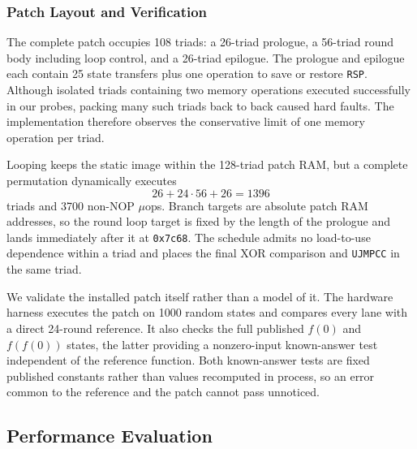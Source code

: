 \documentclass[journal=tches,submission]{iacrtrans}
\makeatletter
\newcommand{\code}[1]{\texttt{#1}}
\newcommand{\uaddr}[1]{\texttt{0x#1}}
\renewcommand\paragraph{\@startsection{paragraph}{4}{\z@}%
      {1.75ex \@plus .3ex \@minus .2ex}%
      {-1em}%
      {\normalfont\normalsize\bfseries\SS@parafont}}
\makeatother
\begin{document}
\subsubsection{Patch Layout and Verification}

The complete patch occupies 108 triads: a 26-triad prologue, a 56-triad round body including loop control, and a 26-triad epilogue.
The prologue and epilogue each contain 25 state transfers plus one operation to save or restore \code{RSP}.
Although isolated triads containing two memory operations executed successfully in our probes, packing many such triads back to back caused hard faults.
The implementation therefore observes the conservative limit of one memory operation per triad.

Looping keeps the static image within the 128-triad patch RAM, but a complete permutation dynamically executes
\[
26 + 24\cdot56 + 26 = 1396
\]
triads and 3700 non-NOP $\mu$ops.
Branch targets are absolute patch RAM addresses, so the round loop target is fixed by the length of the prologue and lands immediately after it at \uaddr{7c68}.
The schedule admits no load-to-use dependence within a triad and places the final XOR comparison and \code{UJMPCC} in the same triad.

We validate the installed patch itself rather than a model of it.
The hardware harness executes the patch on 1000 random states and compares every lane with a direct 24-round reference.
It also checks the full published $f(0)$ and $f(f(0))$ states, the latter providing a nonzero-input known-answer test independent of the reference function.
Both known-answer tests are fixed published constants rather than values recomputed in process, so an error common to the reference and the patch cannot pass unnoticed.

\subsection{Performance Evaluation}

\end{document}
